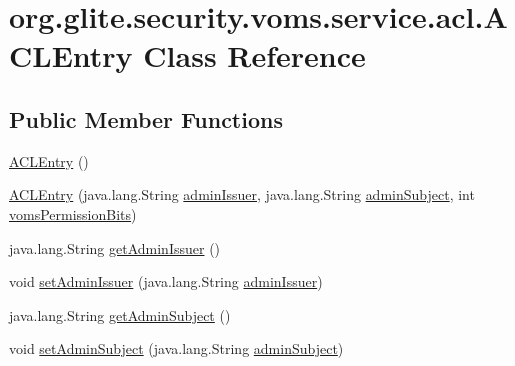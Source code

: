 \hypertarget{classorg_1_1glite_1_1security_1_1voms_1_1service_1_1acl_1_1ACLEntry}{
\section{org.glite.security.voms.service.acl.ACLEntry Class Reference}
\label{classorg_1_1glite_1_1security_1_1voms_1_1service_1_1acl_1_1ACLEntry}
}
\subsection*{Public Member Functions}
\begin{DoxyCompactItemize}
\item 
\hyperlink{classorg_1_1glite_1_1security_1_1voms_1_1service_1_1acl_1_1ACLEntry_aa5209e5da98daf3cf257a0754701c3ad}{ACLEntry} ()
\item 
\hyperlink{classorg_1_1glite_1_1security_1_1voms_1_1service_1_1acl_1_1ACLEntry_a262b27ecdfecb9dbd44b663d09fb8dd5}{ACLEntry} (java.lang.String \hyperlink{classorg_1_1glite_1_1security_1_1voms_1_1service_1_1acl_1_1ACLEntry_a04aa947f12248d78c84c941ef8cb8ab4}{adminIssuer}, java.lang.String \hyperlink{classorg_1_1glite_1_1security_1_1voms_1_1service_1_1acl_1_1ACLEntry_aa6011ea36c14ef998ec1966ee7188c2f}{adminSubject}, int \hyperlink{classorg_1_1glite_1_1security_1_1voms_1_1service_1_1acl_1_1ACLEntry_a77063368e74f27cc20884c2fd33448c4}{vomsPermissionBits})
\item 
java.lang.String \hyperlink{classorg_1_1glite_1_1security_1_1voms_1_1service_1_1acl_1_1ACLEntry_a5fdd24232d951ade7b41c06afd5278dd}{getAdminIssuer} ()
\item 
void \hyperlink{classorg_1_1glite_1_1security_1_1voms_1_1service_1_1acl_1_1ACLEntry_a21985ee590861ec0ec89e95bf4a62bf2}{setAdminIssuer} (java.lang.String \hyperlink{classorg_1_1glite_1_1security_1_1voms_1_1service_1_1acl_1_1ACLEntry_a04aa947f12248d78c84c941ef8cb8ab4}{adminIssuer})
\item 
java.lang.String \hyperlink{classorg_1_1glite_1_1security_1_1voms_1_1service_1_1acl_1_1ACLEntry_a672ec9aaa2f4fdb28518e3dee4688b81}{getAdminSubject} ()
\item 
void \hyperlink{classorg_1_1glite_1_1security_1_1voms_1_1service_1_1acl_1_1ACLEntry_a669f9dccee775dc25c39f2859566c114}{setAdminSubject} (java.lang.String \hyperlink{classorg_1_1glite_1_1security_1_1voms_1_1service_1_1acl_1_1ACLEntry_aa6011ea36c14ef998ec1966ee7188c2f}{adminSubject})
\item 

\end{DoxyCompactItemize}
